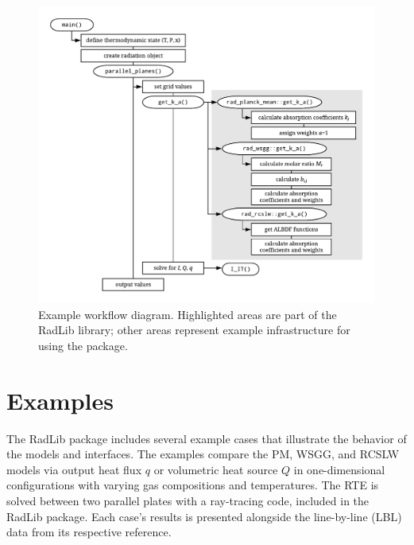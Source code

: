 \documentclass[preprint,12pt]{elsarticle}
\begin{document}
%
\begin{figure}
	\begin{center}
        \includegraphics[width=\textwidth]{fig_radlib_structure.pdf}
	\end{center}
	\caption{Example workflow diagram. Highlighted areas are part of the RadLib library; other areas represent example infrastructure for using the package.}
\label{fig:flowchart}
\end{figure}
%


\section{Examples} \label{s:Examples}

The RadLib package includes several example cases that illustrate the behavior of the models and interfaces. The examples compare the PM, WSGG, and RCSLW models via output heat flux $q$ or volumetric heat source $Q$ in one-dimensional configurations with varying gas compositions and temperatures. 
The RTE is solved between two parallel plates with a ray-tracing code, included in the RadLib package. Each case's results is presented alongside the line-by-line (LBL) data from its respective reference. 
\end{document}
